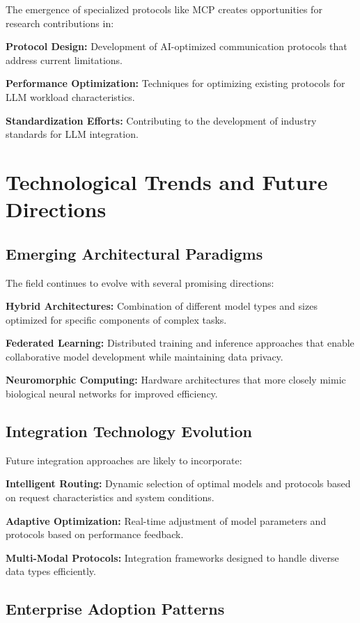 The emergence of specialized protocols like MCP creates opportunities for research contributions in:

\textbf{Protocol Design:} Development of AI-optimized communication protocols that address current limitations.

\textbf{Performance Optimization:} Techniques for optimizing existing protocols for LLM workload characteristics.

\textbf{Standardization Efforts:} Contributing to the development of industry standards for LLM integration.

\section{Technological Trends and Future Directions}

\subsection{Emerging Architectural Paradigms}

The field continues to evolve with several promising directions:

\textbf{Hybrid Architectures:} Combination of different model types and sizes optimized for specific components of complex tasks.

\textbf{Federated Learning:} Distributed training and inference approaches that enable collaborative model development while maintaining data privacy.

\textbf{Neuromorphic Computing:} Hardware architectures that more closely mimic biological neural networks for improved efficiency.

\subsection{Integration Technology Evolution}

Future integration approaches are likely to incorporate:

\textbf{Intelligent Routing:} Dynamic selection of optimal models and protocols based on request characteristics and system conditions.

\textbf{Adaptive Optimization:} Real-time adjustment of model parameters and protocols based on performance feedback.

\textbf{Multi-Modal Protocols:} Integration frameworks designed to handle diverse data types efficiently.

\subsection{Enterprise Adoption Patterns}


